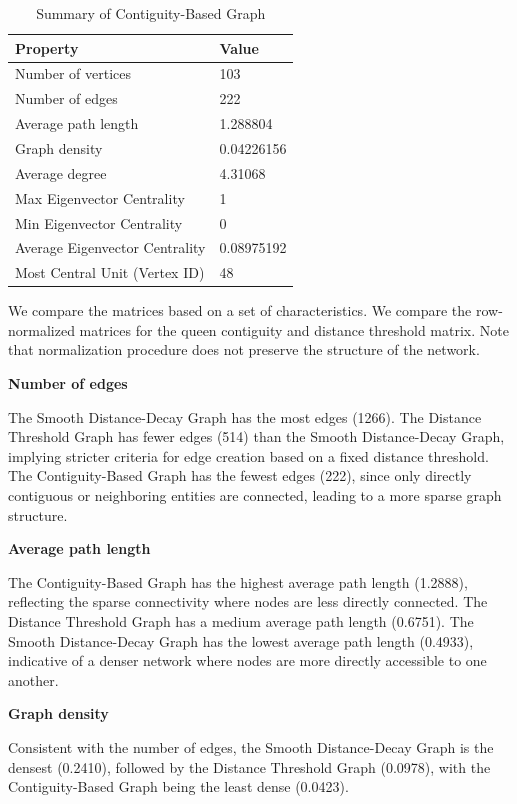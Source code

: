 \documentclass[
  a4paper,
]{article}
\begin{document}
\begin{table}

\caption{\label{tab:unnamed-chunk-7}Summary of Contiguity-Based Graph}
\centering
\begin{tabular}[t]{l|l}
\hline
Property & Value\\
\hline
Number of vertices & 103\\
\hline
Number of edges & 222\\
\hline
Average path length & 1.288804\\
\hline
Graph density & 0.04226156\\
\hline
Average degree & 4.31068\\
\hline
Max Eigenvector Centrality & 1\\
\hline
Min Eigenvector Centrality & 0\\
\hline
Average Eigenvector Centrality & 0.08975192\\
\hline
Most Central Unit (Vertex ID) & 48\\
\hline
\end{tabular}
\end{table}

We compare the matrices based on a set of characteristics. We compare
the row-normalized matrices for the queen contiguity and distance
threshold matrix. Note that normalization procedure does not preserve
the structure of the network.

\textbf{Number of edges}

The Smooth Distance-Decay Graph has the most edges (1266). The Distance
Threshold Graph has fewer edges (514) than the Smooth Distance-Decay
Graph, implying stricter criteria for edge creation based on a fixed
distance threshold. The Contiguity-Based Graph has the fewest edges
(222), since only directly contiguous or neighboring entities are
connected, leading to a more sparse graph structure.

\textbf{Average path length}

The Contiguity-Based Graph has the highest average path length (1.2888),
reflecting the sparse connectivity where nodes are less directly
connected. The Distance Threshold Graph has a medium average path length
(0.6751). The Smooth Distance-Decay Graph has the lowest average path
length (0.4933), indicative of a denser network where nodes are more
directly accessible to one another.

\textbf{Graph density}

Consistent with the number of edges, the Smooth Distance-Decay Graph is
the densest (0.2410), followed by the Distance Threshold Graph (0.0978),
with the Contiguity-Based Graph being the least dense (0.0423).
\end{document}
